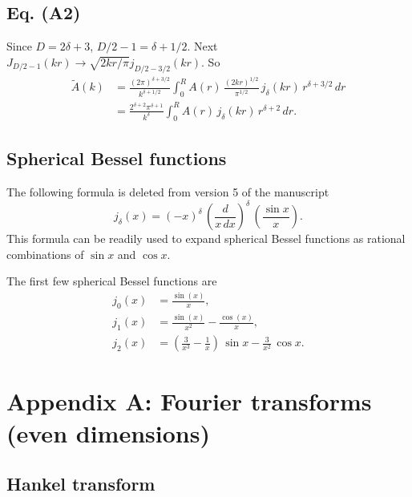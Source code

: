 \documentclass[preprint]{revtex4-1}
\numberwithin{equation}{subsection}
\numberwithin{table}{section}
\begin{document}
\subsection{Eq. (A2)}

Since $D = 2\delta + 3$, $D/2 - 1 = \delta + 1/2$.
%
Next $J_{D/2-1}(kr) \rightarrow \sqrt{2 k r/\pi} j_{D/2-3/2} (kr)$.
%
So
\begin{align*}
\tilde A(k)
&=
\frac{ (2 \pi)^{\delta + 3/2} } { k^{\delta + 1/2} }
\int_0^R
  A(r) \, \frac{ (2kr)^{1/2} } { \pi^{1/2} } \,
  j_\delta(k r) \, r^{\delta + 3/2}\, dr \\
&=
  \frac{ 2^{\delta + 2} \pi^{\delta + 1} } { k^\delta }
\int_0^R
  A(r) \, j_\delta(k r) \, r^{\delta + 2} \, dr.
\end{align*}



\subsection{Spherical Bessel functions}

The following formula is deleted from version 5 of the manuscript
\begin{equation}
  j_\delta(x)
=
  (-x)^\delta \,
  \left(
    \frac{ d }
    { x \, dx }
  \right)^\delta
  \,
  \left(
    \frac{ \sin x } { x }
  \right).
\end{equation}
This formula can be readily used to expand
spherical Bessel functions
as rational combinations of $\sin x$ and $\cos x$.

The first few spherical Bessel functions are
\begin{align*}
  j_0(x)
&=
  \frac{ \sin(x) } { x },
\\
  j_1(x)
&=
  \frac{ \sin(x) } { x^2 }
-
  \frac{ \cos(x) } { x },
\\
  j_2(x)
&=
  \left(
    \frac{ 3 } { x^3 }
    -
    \frac{ 1 } { x }
  \right)
  \,
  \sin x
  -
  \frac{ 3 } { x^2 }
  \,
  \cos x.
\end{align*}



\section{Appendix A: Fourier transforms (even dimensions)}

\subsection{Hankel transform}
\end{document}
